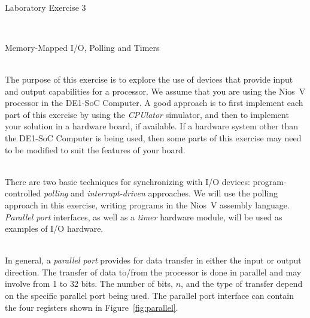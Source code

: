 \documentclass[epsfig,10pt,fullpage]{article}
\begin{document}
~\\
\centerline{\huge Laboratory Exercise 3}
~\\
\centerline{\large Memory-Mapped I/O, Polling and Timers}
~\\

\noindent
The purpose of this exercise is to explore the use of devices that provide input and
output capabilities for a processor. We assume that you are using the Nios~V processor in
the DE1-SoC Computer. A good approach is to first implement each part of this exercise by 
using the {\it CPUlator} simulator, and then to implement your solution in a hardware board,
if available.  If a hardware system other than the DE1-SoC Computer is being used, then 
some parts of this exercise may need to be modified to suit the features of your board. 

~\\
\noindent
There are two basic techniques for synchronizing with I/O devices:
program-controlled \emph{polling} and \emph{interrupt-driven} approaches.  
We will use the polling approach in this exercise, writing programs in the Nios~V
assembly language.  {\it Parallel port} interfaces, as well as a {\it timer} hardware 
module, will be used as examples of I/O hardware.

~\\
\noindent
In general, a {\it parallel port} provides for data transfer in either the input or 
output direction.  The transfer of data to/from the processor is done in parallel and may 
involve from 1 to 32 bits.  The number of bits, $n$, and the type of transfer depend on the
specific parallel port being used. The parallel port interface can contain the four 
registers shown in Figure~\ref{fig:parallel}.
\end{document}
